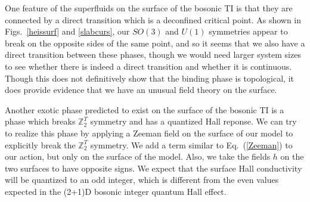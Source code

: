 \documentclass[prb,twocolumn]{revtex4-1}
\def\ztwot{\mathbb{Z}_2^T}
\begin{document}
One feature of the superfluids on the surface of the bosonic TI is that they are connected by a direct transition which is a deconfined critical point.\cite{SenthilVishwanath} As shown in Figs.~\ref{heissurf} and \ref{slabcurs}, our $SO(3)$ and $U(1)$ symmetries appear to break on the opposite sides of the same point, and so it seems that we also have a direct transition between these phases, though we would need larger system sizes to see whether there is indeed a direct transition and whether it is continuous.
Though this does not definitively show that the binding phase is topological, it does provide evidence that we have an unusual field theory on the surface.


Another exotic phase predicted to exist on the surface of the bosonic TI is a phase which breaks $\ztwot$ symmetry and has a quantized Hall reponse. We can try to realize this phase by applying a Zeeman field on the surface of our model to explicitly break the $\ztwot$ symmetry. We add a term similar to Eq.~(\ref{Zeeman}) to our action, but only on the surface of the model. Also, we take the fields $h$ on the two surfaces to have opposite signs. We expect that the surface Hall conductivity will be quantized to an odd integer, which is different from the even values expected in the (2+1)D bosonic integer quantum Hall effect.
\end{document}
